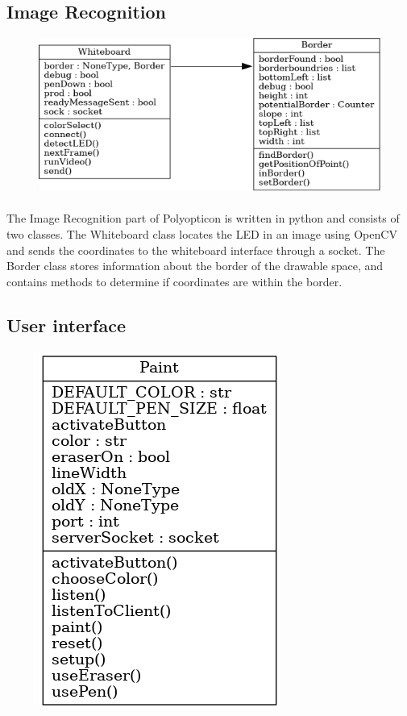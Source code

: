 \documentclass[12pt]{article}
\begin{document}
\subsection{Image Recognition}
\begin{figure}[H]
\centering
\includegraphics[scale=.5]{classdiagram.png}
\end{figure}
\paragraph{}
The Image Recognition part of Polyopticon is written in python and consists of two classes.
The Whiteboard class locates the LED in an image using OpenCV and sends the coordinates to the whiteboard interface through a socket.
The Border class stores information about the border of the drawable space, and contains methods to determine if coordinates are within the border.
\subsection{User interface} 
\begin{figure}[H]
\centering
\includegraphics[scale=.5]{classes.png}
\end{figure}
\end{document}
